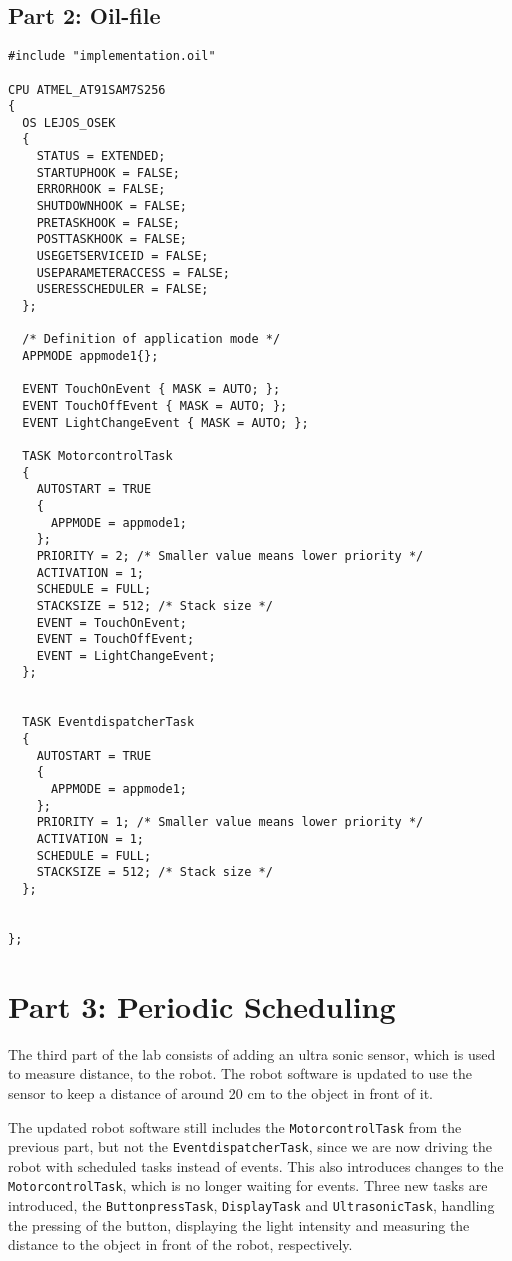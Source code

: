 \documentclass[a4paper,10pt]{report}
\begin{document}
\subsection*{Part 2: Oil-file}

\begin{lstlisting}[label=some-code,caption=part2.oil,mathescape]
#include "implementation.oil"

CPU ATMEL_AT91SAM7S256
{
  OS LEJOS_OSEK
  {
    STATUS = EXTENDED;
    STARTUPHOOK = FALSE;
    ERRORHOOK = FALSE;
    SHUTDOWNHOOK = FALSE;
    PRETASKHOOK = FALSE;
    POSTTASKHOOK = FALSE;
    USEGETSERVICEID = FALSE;
    USEPARAMETERACCESS = FALSE;
    USERESSCHEDULER = FALSE;
  };

  /* Definition of application mode */
  APPMODE appmode1{};

  EVENT TouchOnEvent { MASK = AUTO; };
  EVENT TouchOffEvent { MASK = AUTO; };
  EVENT LightChangeEvent { MASK = AUTO; };	

  TASK MotorcontrolTask
  {
    AUTOSTART = TRUE
    {
      APPMODE = appmode1;
    };
    PRIORITY = 2; /* Smaller value means lower priority */
    ACTIVATION = 1;
    SCHEDULE = FULL;
    STACKSIZE = 512; /* Stack size */
    EVENT = TouchOnEvent;
    EVENT = TouchOffEvent;
    EVENT = LightChangeEvent;
  };


  TASK EventdispatcherTask 
  {
    AUTOSTART = TRUE
    {
      APPMODE = appmode1;
    };
    PRIORITY = 1; /* Smaller value means lower priority */
    ACTIVATION = 1;
    SCHEDULE = FULL;
    STACKSIZE = 512; /* Stack size */
  };


};

\end{lstlisting}
\newpage

\section*{Part 3: Periodic Scheduling}

The third part of the lab consists of adding an ultra sonic sensor, which is used to measure distance, to the robot. The robot software is updated to use the sensor to keep a distance of around 20 cm to the object in front of it.

The updated robot software still includes the \texttt{MotorcontrolTask} from the previous part, but not the \texttt{EventdispatcherTask}, since we are now driving the robot with scheduled tasks instead of events. This also introduces changes to the \texttt{MotorcontrolTask}, which is no longer waiting for events. Three new tasks are introduced, the \texttt{ButtonpressTask}, \texttt{DisplayTask} and \texttt{UltrasonicTask}, handling the pressing of the button, displaying the light intensity and measuring the distance to the object in front of the robot, respectively.
\end{document}

